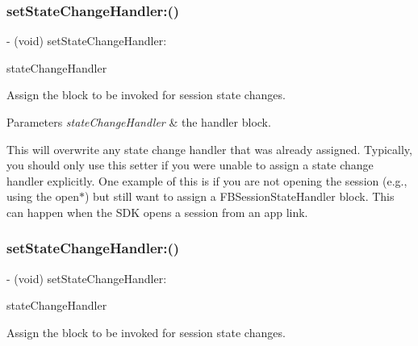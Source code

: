 \subsubsection{\texorpdfstring{set\+State\+Change\+Handler\+:()}{setStateChangeHandler:()}\hspace{0.1cm}{\footnotesize\ttfamily [1/5]}}
{\footnotesize\ttfamily -\/ (void) set\+State\+Change\+Handler\+: \begin{DoxyParamCaption}\item[{(F\+B\+Session\+State\+Handler)}]{state\+Change\+Handler }\end{DoxyParamCaption}}

Assign the block to be invoked for session state changes.


\begin{DoxyParams}{Parameters}
{\em state\+Change\+Handler} & the handler block.\\
\hline
\end{DoxyParams}
This will overwrite any state change handler that was already assigned. Typically, you should only use this setter if you were unable to assign a state change handler explicitly. One example of this is if you are not opening the session (e.\+g., using the {\ttfamily open$\ast$}) but still want to assign a {\ttfamily F\+B\+Session\+State\+Handler} block. This can happen when the S\+DK opens a session from an app link. \mbox{\label{interfaceFBSession_a56e9467165f832f3151dadd14190868b}} 
\subsubsection{\texorpdfstring{set\+State\+Change\+Handler\+:()}{setStateChangeHandler:()}\hspace{0.1cm}{\footnotesize\ttfamily [2/5]}}
{\footnotesize\ttfamily -\/ (void) set\+State\+Change\+Handler\+: \begin{DoxyParamCaption}\item[{(F\+B\+Session\+State\+Handler)}]{state\+Change\+Handler }\end{DoxyParamCaption}}

Assign the block to be invoked for session state changes.


